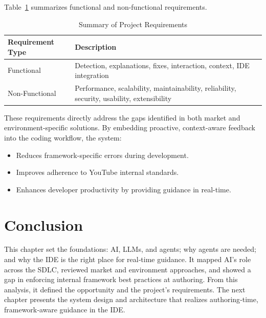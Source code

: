 \begin{spacing}{1.2}
Table~\ref{tab:extended_requirements} summarizes functional and non-functional requirements.

\begin{table}[H]
\centering
\caption{Summary of Project Requirements}
\label{tab:extended_requirements}
\begin{tabular}{|p{3cm}|p{11cm}|}
\hline
\textbf{Requirement Type} & \textbf{Description} \\
\hline
Functional & Detection, explanations, fixes, interaction, context, IDE integration \\
\hline
Non-Functional & Performance, scalability, maintainability, reliability, security, usability, extensibility \\
\hline
\end{tabular}
\end{table}


These requirements directly address the gaps identified in both market and environment-specific solutions. By embedding proactive, context-aware feedback into the coding workflow, the system:

\begin{itemize}
\item Reduces framework-specific errors during development.
\item Improves adherence to YouTube internal standards.
\item Enhances developer productivity by providing guidance in real-time.
\end{itemize}

\section*{Conclusion}

This chapter set the foundations: AI, LLMs, and agents; why agents are needed; and why the IDE is the right place for real‑time guidance. It mapped AI’s role across the SDLC, reviewed market and environment approaches, and showed a gap in enforcing internal framework best practices at authoring. From this analysis, it defined the opportunity and the project’s requirements. The next chapter presents the system design and architecture that realizes authoring‑time, framework‑aware guidance in the IDE.






\end{spacing}


